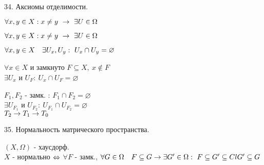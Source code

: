 \documentclass[11pt, fleqn]{article}
\begin{document}
    \begin{question}{34. Аксиомы отделимости.}
        \begin{theorem} [Колмогорова]
            $\forall x, y \in X: x \neq y \ \ra \ \exists U \in \Omega$
        \end{theorem}

        \begin{theorem} [Тихонова] 
            $\forall x, y \in X: x \neq y \ \ra \ \exists U \in \Omega$
        \end{theorem}

        \begin{theorem} [Хаусдорфа]
            $\forall x, y \in X \q \exists U_x, U_y: \ U_x \cap U_y = \varnothing$
        \end{theorem}

        \begin{theorem} [3]
            $\forall x \in X$ и замкнуто $F \subseteq X, \  x \not \in F$\\
            $\exists U_x$ и $U_F : \ U_x \cap U_F = \varnothing$
        \end{theorem}

        \begin{theorem} [4]
            $F_1, F_2$ - замк. : $F_1 \cap F_2 = \varnothing$\\
            $\exists U_{F_1}$ и $U_{F_2}: \ U_{F_1} \cap U_{F_2} = \varnothing$\\
            $T_2 \rightarrow T_1 \rightarrow T_0$
        \end{theorem}
    \end{question}

    \begin{question}{35. Нормальность матрического пространства.}
        \begin{definition} 
            $(X, \Omega)$ - хаусдорф.\\
            $X$ - нормально $\Leftrightarrow$ $\forall F$ - замк., $\forall G \in \Omega \quad F \subseteq G \rightarrow 
            \exists G' \in \Omega:\\ \ F \subseteq G' \subseteq Cl G' \subseteq G$
        \end{definition}
    \end{question}
\end{document}
